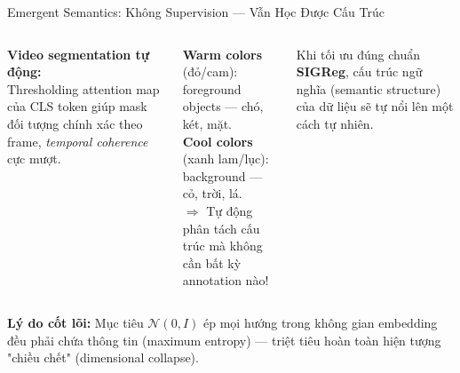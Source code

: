 \documentclass[aspectratio=169,9pt]{beamer}
\begin{document}
\begin{frame}{Emergent Semantics: Không Supervision — Vẫn Học Được Cấu Trúc}
\begin{columns}[T]

\vspace{0.8em}
\textbf{Video segmentation tự động:}\\[2pt]
Thresholding attention map của CLS token giúp mask đối tượng chính xác theo frame, \emph{temporal coherence} cực mượt.


\begin{goodbox}
\footnotesize \textbf{Warm colors} (đỏ/cam): foreground objects — chó, két, mặt.\\[5pt]
\textbf{Cool colors} (xanh lam/lục): background — cỏ, trời, lá.\\[5pt]
$\Rightarrow$ Tự động phân tách cấu trúc mà không cần bất kỳ annotation nào!
\end{goodbox}

\vspace{0.6em}
\begin{accentbox}
\footnotesize Khi tối ưu đúng chuẩn \textbf{SIGReg}, cấu trúc ngữ nghĩa (semantic structure) của dữ liệu sẽ tự nổi lên một cách tự nhiên.
\end{accentbox}

\end{columns}

\vspace{0.8em}
\begin{primarybox}
\footnotesize \textbf{Lý do cốt lõi:} Mục tiêu $\mathcal{N}(0,I)$ ép mọi hướng trong không gian embedding đều phải chứa thông tin (maximum entropy) — triệt tiêu hoàn toàn hiện tượng "chiều chết" (dimensional collapse).
\end{primarybox}
\end{frame}
\end{document}
